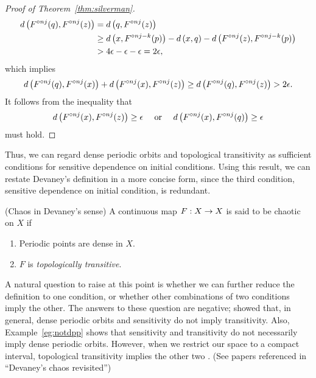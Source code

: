 \documentclass[12pt,draft,twoside]{book}
\begin{document}
\begin{proof}[Proof of Theorem~\ref{thm:silverman}]
\begin{align*}
    d\left( F^{\circ nj}(q), F^{\circ nj}(z) \right) 
    &= d\left( q, F^{\circ nj}(z) \right)  \\
    &\geq  d\left( x, F^{\circ nj-k}(p) \right) - d\left( x,q \right) - d\left( F^{\circ nj}(z), F^{\circ nj - k}(p) \right)  \\
    &> 4\epsilon - \epsilon - \epsilon 
    = 2\epsilon,
  \end{align*}
  which implies
  \begin{equation*}
    d\left( F^{\circ nj}(q), F^{\circ nj}(x) \right) + d\left( F^{\circ nj}(x), F^{\circ nj}(z) \right) 
    \geq d\left( F^{\circ nj}(q), F^{\circ nj}(z) \right)
    > 2\epsilon.
  \end{equation*}
  It follows from the inequality that 
  \begin{equation*}
    d\left( F^{\circ nj}(x), F^{\circ nj}(z) \right) \geq \epsilon \quad\mbox{ or }\quad d\left( F^{\circ nj}(x), F^{\circ nj}(q) \right) \geq \epsilon 
  \end{equation*}
  must hold.
\end{proof}

Thus, we can regard dense periodic orbits and topological transitivity as sufficient conditions for sensitive dependence on initial conditions.
Using this result, we can restate Devaney's definition in a more concise form, since the third condition, sensitive dependence on initial condition, is redundant.
\begin{definition}
  (Chaos in Devaney's sense) 
  A continuous map $F: X\rightarrow X$ is said to be chaotic on $X$ if
  \begin{enumerate}
    \item Periodic points are dense in $X$.
    \item $F$ is \textit{topologically transitive}.
  \end{enumerate}
\end{definition}
A natural question to raise at this point is whether we can further reduce the definition to one condition, or whether other combinations of two conditions imply the other.
The answers to these question are negative; \citet{assaf} showed that, in general, dense periodic orbits and sensitivity do not imply transitivity.
Also, Example~\ref{eg:notdpp} shows that sensitivity and transitivity do not necessarily imply dense periodic orbits.
However, when we restrict our space to a compact interval, topological transitivity implies the other two \citep{silverman}.
(See papers referenced in ``Devaney's chaos revisited'')
\end{document}
